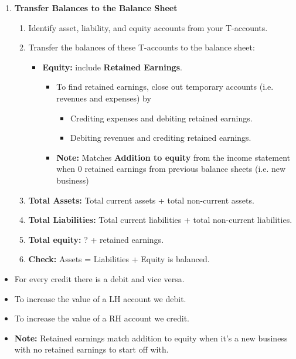 \begin{process}
\begin{enumerate}
        \item \textbf{Transfer Balances to the Balance Sheet}
        \begin{enumerate}
            \item Identify asset, liability, and equity accounts from your T-accounts.
            \item Transfer the balances of these T-accounts to the balance sheet:
            \begin{itemize}
                \item \textbf{Equity:} include \textbf{Retained Earnings}. 
                \begin{itemize}
                    \item To find retained earnings, close out temporary accounts (i.e. revenues and expenses) by 
                    \begin{itemize}
                        \item Crediting expenses and debiting retained earnings.
                        \item Debiting revenues and crediting retained earnings.
                    \end{itemize}
                    \item \textbf{Note:} Matches \textbf{Addition to equity} from the income statement when $0$ retained earnings from previous balance sheets (i.e. new business)
                \end{itemize}
            \end{itemize}
            \item \textbf{Total Assets:} Total current assets + total non-current assets.
            \item \textbf{Total Liabilities:} Total current liabilities + total non-current liabilities.
            \item \textbf{Total equity:} ? + retained earnings.
            \item \textbf{Check:} Assets = Liabilities + Equity is balanced.
        \end{enumerate}
    \end{enumerate}    
\end{process}

\begin{warning}
    \begin{itemize}
        \item For every credit there is a debit and vice versa. 
        \item To increase the value of a LH account we debit. 
        \item To increase the value of a RH account we credit.
        \item \textbf{Note:} Retained earnings match addition to equity when it's a new business with no retained earnings to start off with. 
    \end{itemize}
\end{warning}


